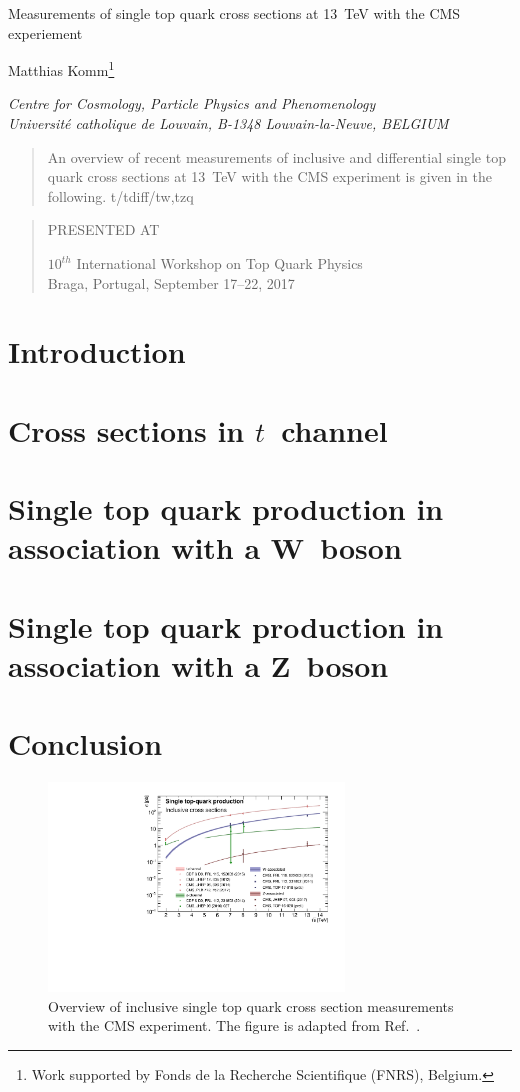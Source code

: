 \documentclass[12pt]{article}
\newcommand\pubnumber{}
\newcommand\pubdate{\today}
\def\institute{Centre for Cosmology, Particle Physics and Phenomenology\\
Universit\'e catholique de Louvain, B-1348 Louvain-la-Neuve, BELGIUM}
\def\support{\footnote{Work supported by Fonds de la Recherche Scientifique (FNRS), Belgium.}}
\def\Title#1{\begin{center} {\Large #1 } \end{center}}
\def\Author#1{\begin{center}{ \sc #1} \end{center}}
\def\Address#1{\begin{center}{ \it #1} \end{center}}
\newcommand\pubblock{\rightline{\begin{tabular}{l} \pubnumber\\
         \pubdate  \end{tabular}}}
\newenvironment{Abstract}{\begin{quotation}  }{\end{quotation}}
\newenvironment{Presented}{\begin{quotation} \begin{center} 
             PRESENTED AT\end{center}\bigskip 
      \begin{center}\begin{large}}{\end{large}\end{center} \end{quotation}}
\begin{document}
\begin{titlepage}
\pubblock

\vfill
\Title{Measurements of single top quark cross sections at 13~TeV with the CMS experiement}
\vfill
\Author{Matthias Komm\support}
\Address{\institute}
\vfill
\begin{Abstract}
An overview of recent measurements of inclusive and differential single top quark cross sections at 13~TeV with the CMS experiment is given in the following. t/tdiff/tw,tzq
\end{Abstract}
\vfill
\begin{Presented}
$10^{th}$ International Workshop on Top Quark Physics\\
Braga, Portugal,  September 17--22, 2017
\end{Presented}
\vfill
\end{titlepage}
\def\thefootnote{\fnsymbol{footnote}}
\setcounter{footnote}{0}
%

\section{Introduction}


\section{Cross sections in $t$~channel}

\section{Single top quark production in association with a W~boson}

\section{Single top quark production in association with a Z~boson}

\section{Conclusion}

\begin{figure}[!htb]
\begin{center}
\includegraphics[width=0.7\textwidth]{singletopSep2017_noATLAS.pdf}
\caption{Overview of inclusive single top quark cross section measurements with the CMS experiment. The figure is adapted from Ref.~\cite{Giammanco}.}
\end{center}
\end{figure}
\end{document}
